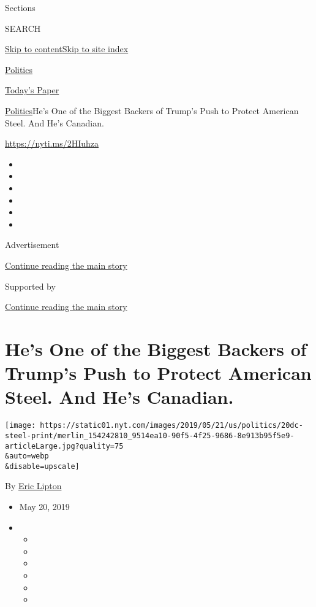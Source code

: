 Sections

SEARCH

\protect\hyperlink{site-content}{Skip to
content}\protect\hyperlink{site-index}{Skip to site index}

\href{https://www.nytimes.com/section/politics}{Politics}

\href{https://myaccount.nytimes.com/auth/login?response_type=cookie\&client_id=vi}{}

\href{https://www.nytimes.com/section/todayspaper}{Today's Paper}

\href{/section/politics}{Politics}\textbar{}He's One of the Biggest
Backers of Trump's Push to Protect American Steel. And He's Canadian.

\url{https://nyti.ms/2HIuhza}

\begin{itemize}
\item
\item
\item
\item
\item
\item
\end{itemize}

Advertisement

\protect\hyperlink{after-top}{Continue reading the main story}

Supported by

\protect\hyperlink{after-sponsor}{Continue reading the main story}

\hypertarget{hes-one-of-the-biggest-backers-of-trumps-push-to-protect-american-steel-and-hes-canadian}{%
\section{He's One of the Biggest Backers of Trump's Push to Protect
American Steel. And He's
Canadian.}\label{hes-one-of-the-biggest-backers-of-trumps-push-to-protect-american-steel-and-hes-canadian}}

\texttt{[image: https://static01.nyt.com/images/2019/05/21/us/politics/20dc-steel-print/merlin\_154242810\_9514ea10-90f5-4f25-9686-8e913b95f5e9-articleLarge.jpg?quality=75\\\&auto=webp\\\&disable=upscale]}

By \href{https://www.nytimes.com/by/eric-lipton}{Eric Lipton}

\begin{itemize}
\item
  May 20, 2019
\item
  \begin{itemize}
  \item
  \item
  \item
  \item
  \item
  \item
  \end{itemize}
\end{itemize}

